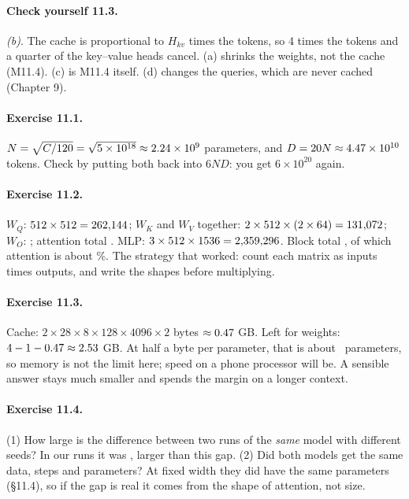 \paragraph{Check yourself 11.3.} \emph{(b)}. The cache is proportional to $H_{kv}$ times the tokens, so
4 times the tokens and a quarter of the key--value heads cancel. (a) shrinks the weights, not the cache
(M11.4). (c) is M11.4 itself. (d) changes the queries, which are never cached (Chapter 9).

\paragraph{Exercise 11.1.} $N=\sqrt{C/120}=\sqrt{5\times10^{18}}\approx2.24\times10^{9}$ parameters, and
$D=20N\approx4.47\times10^{10}$ tokens. Check by putting both back into $6ND$: you get $6\times10^{20}$ again.

\paragraph{Exercise 11.2.} $W_Q$: $512\times512=262{,}144$; $W_K$ and $W_V$ together: $2\times512\times(2\times64)=131{,}072$;
$W_O$: \nElevenExTwoWq; attention total \nElevenExTwoAttn. MLP: $3\times512\times1536=2{,}359{,}296$. Block total
\nElevenExTwoBlock, of which attention is about \nElevenExTwoShare\%. The strategy that worked: count each matrix as inputs
times outputs, and write the shapes before multiplying.

\paragraph{Exercise 11.3.} Cache: $2\times28\times8\times128\times4096\times2$ bytes $\approx0.47$ GB.
Left for weights: $4-1-0.47\approx2.53$ GB. At half a byte per parameter, that is about \nElevenExThreeN\ 
parameters, so memory is not the limit here; speed on a phone processor will be. A sensible answer stays
much smaller and spends the margin on a longer context.

\paragraph{Exercise 11.4.} (1) How large is the difference between two runs of the \emph{same} model with
different seeds? In our runs it was \nElevenSpread, larger than this gap. (2) Did both models get the same
data, steps and parameters? At fixed width they did have the same parameters (\S11.4), so if the gap is
real it comes from the shape of attention, not size.

